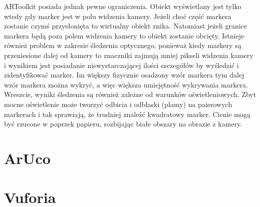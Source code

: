 ARToolkit posiada jednak pewne ograniczenia. Obiekt wyświetlany jest tylko wtedy gdy marker jest w polu widzenia kamery. Jeżeli choć część markera zostanie czymś przysłonięta to wirtualny obiekt znika. Natomiast jeżeli granice markera będą poza polem widzenia kamery to obiekt zostanie obcięty. Istnieje również problem w zakresie śledzenia optycznego, ponieważ kiedy markery są przeniesione dalej od kamery to znaczniki zajmują mniej pikseli widzenia kamery i wynikiem jest posiadanie niewystarczającej ilości szczegółów by wyśledzić i zidentyfikować marker. Im większy fizycznie osadzony wzór markera tym dalej wzór markera można wykryć, a więc większa umiejętność wykrywania markera. Wreszcie, wyniki śledzenia są również zależne od warunków oświetleniowych. Zbyt mocne oświetlenie może tworzyć odbicia i odblaski (plamy) na paierowych markerach i tak sprawiają, że trudniej znaleźć kwadratowy marker. Cienie mogą być rzucone w poprzek papieru, rozbijając białe obszary na obrazie z kamery.


\section{ArUco}
\label{sec:aruco}




\section{Vuforia}
\label{sec:vuforia}


